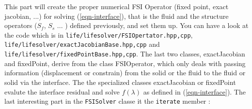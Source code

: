 This part will create the proper numerical FSI Operator (fixed point, exact jacobian, ...)
for solving (\ref{eqn-interface}), that is the fluid and the structure operators ($S_f$, $S_s$ ... )
defined previously, and set them up. You can have a look at the code which is in \verb!life/lifesolver/FSIOpertator.hpp,cpp!,
\verb!life/lifesolver/exactJacobianBase.hpp,cpp! and \verb!life/lifesolver/fixedPointBase.hpp,cpp!.
The last two classes, exactJacobian and fixedPoint, derive from the class FSIOperator, which only
deals with passing information (displacement or constrain) from the solid or the fluid to the fluid or solid via
the interface. The the specialized classes exactJacobian or fixedPoint evalute the interface residual
and solve $f(\lambda)$ as defined in (\ref{eqn-interface}).
The last interesting part in the \verb!FSISolver! classe it the \verb!iterate! member :
